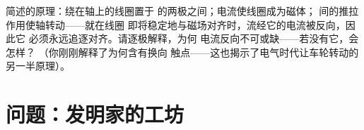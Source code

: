 \begin{exercise}[$\star\star\star$]\label{exo:g8:electric-current-effects:12}
简述的原理：绕在轴上的线圈置于
的两极之间；电流使线圈成为磁体；
间的推拉作用使轴转动——就在线圈
即将稳定地与磁场对齐时，流经它的电流被反向，因此它
必须永远追逐对齐。请逐极解释，为何
电流反向不可或缺——若没有它，会怎样？
（你刚刚解释了为何含有换向
触点——这也揭示了电气时代让车轮转动的
另一半原理）。
\end{exercise}

\section{问题：发明家的工坊}

